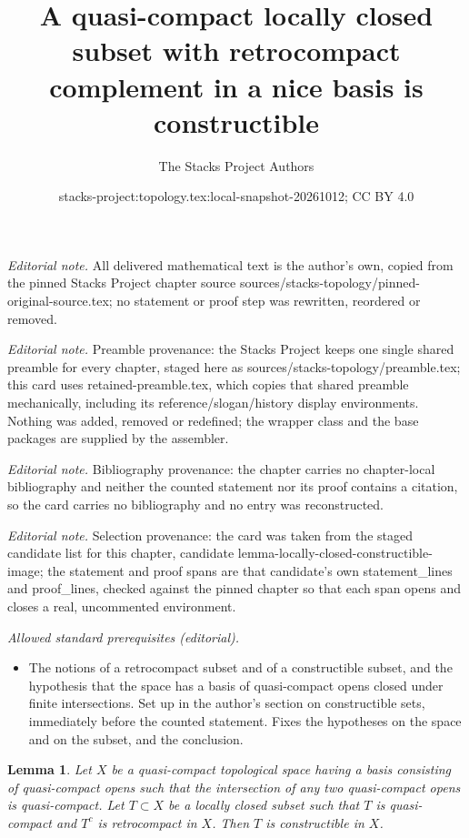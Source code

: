 \documentclass[10pt,a4paper]{amsart}
\title{A quasi-compact locally closed subset with retrocompact complement in a nice basis is constructible}
\author{The Stacks Project Authors}
\date{stacks-project:topology.tex:local-snapshot-20261012; CC BY 4.0}
\theoremstyle{plain}
\newtheorem{lemma}[subsection]{Lemma}
\theoremstyle{definition}
\theoremstyle{remark}
\numberwithin{equation}{subsection}
\begin{document}
\maketitle
\noindent\textit{Editorial note.} All delivered mathematical text is the author's own, copied from the pinned Stacks Project chapter source sources/stacks-topology/pinned-original-source.tex; no statement or proof step was rewritten, reordered or removed.\par\medskip
\noindent\textit{Editorial note.} Preamble provenance: the Stacks Project keeps one single shared preamble for every chapter, staged here as sources/stacks-topology/preamble.tex; this card uses retained-preamble.tex, which copies that shared preamble mechanically, including its reference/slogan/history display environments. Nothing was added, removed or redefined; the wrapper class and the base packages are supplied by the assembler.\par\medskip
\noindent\textit{Editorial note.} Bibliography provenance: the chapter carries no chapter-local bibliography and neither the counted statement nor its proof contains a citation, so the card carries no bibliography and no entry was reconstructed.\par\medskip
\noindent\textit{Editorial note.} Selection provenance: the card was taken from the staged candidate list for this chapter, candidate lemma-locally-closed-constructible-image; the statement and proof spans are that candidate's own statement\_lines and proof\_lines, checked against the pinned chapter so that each span opens and closes a real, uncommented environment.\par\medskip
\noindent\textit{Allowed standard prerequisites (editorial).}\begin{itemize}
\item The notions of a retrocompact subset and of a constructible subset, and the hypothesis that the space has a basis of quasi-compact opens closed under finite intersections. Set up in the author's section on constructible sets, immediately before the counted statement. Fixes the hypotheses on the space and on the subset, and the conclusion.
\end{itemize}\medskip
\begin{lemma}
\label{lemma-locally-closed-constructible-image}
Let $X$ be a quasi-compact topological space having a basis consisting of
quasi-compact opens such that the intersection of any two
quasi-compact opens is quasi-compact.
Let $T \subset X$ be a locally closed subset
such that $T$ is quasi-compact and $T^c$ is retrocompact in $X$.
Then $T$ is constructible in $X$.
\end{lemma}
\end{document}

